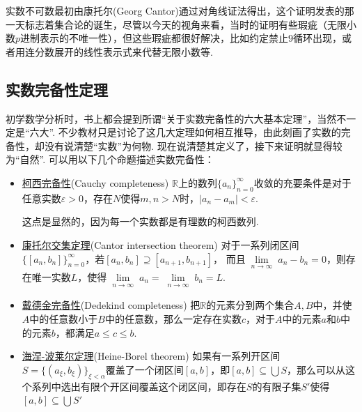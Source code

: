 实数不可数最初由康托尔(Georg Cantor)通过对角线证法得出，这个证明发表的那一天标志着集合论的诞生，尽管以今天的视角来看，当时的证明有些瑕疵（无限小数\(p\)进制表示的不唯一性），但这些瑕疵都很好解决，比如约定禁止\(9\)循环出现，或者用连分数展开的线性表示式来代替无限小数等.


\subsection{实数完备性定理}

初学数学分析时，书上都会提到所谓“关于实数完备性的六大基本定理”，当然不一定是“六大”. 不少教材只是讨论了这几大定理如何相互推导，由此刻画了实数的完备性，却没有说清楚“实数”为何物. 现在说清楚其定义了，接下来证明就显得较为“自然”. 可以用以下几个命题描述实数完备性：

\begin{itemize}
    \item \underline{柯西完备性}(Cauchy completeness) \newline
    \(\mathbb{R}\)上的数列\(\{a_n\}_{n=0}^{\infty}\)收敛的充要条件是对于任意实数\(\varepsilon>0\)，存在\(N\)使得\(m,n>N\)时，\(|a_n-a_m| < \varepsilon\).

    \begin{note}
        这点是显然的，因为每一个实数都是有理数的柯西数列.
    \end{note}
    
    \item \underline{康托尔交集定理}(Cantor intersection theorem) \newline
    对于一系列闭区间\(\{[a_n,b_n]\}_{n=0}^{\infty}\)，若\([a_n,b_n]\supseteq [a_{n+1},b_{n+1}]\)， 而且\(\lim \limits_{\substack{n \to \infty}}a_n-b_n=0\)，则存在唯一实数\(L\)，使得\(\lim \limits_{\substack{n\to\infty}}a_n=\lim \limits_{\substack{n\to\infty}}b_n=L\).

    \item \underline{戴德金完备性}(Dedekind completeness) \newline
    把\(\mathbb{R}\)的元素分到两个集合\(A,B\)中，并使\(A\)中的任意数小于\(B\)中的任意数，那么一定存在实数\(c\)，对于\(A\)中的元素\(a\)和\(b\)中的元素\(b\)，都满足\(a\leq c\leq b\).
    
    \item \underline{海涅-波莱尔定理}(Heine-Borel theorem) \newline
    如果有一系列开区间\(S=\{(a_\xi,b_\xi)\}_{\xi < \alpha}\)覆盖了一个闭区间\([a,b]\)，即\([a,b] \subseteq \bigcup S\)，那么可以从这个系列中选出有限个开区间覆盖这个闭区间，即存在\(S\)的有限子集\(S'\)使得\([a,b] \subseteq \bigcup S'\)


\end{itemize}
